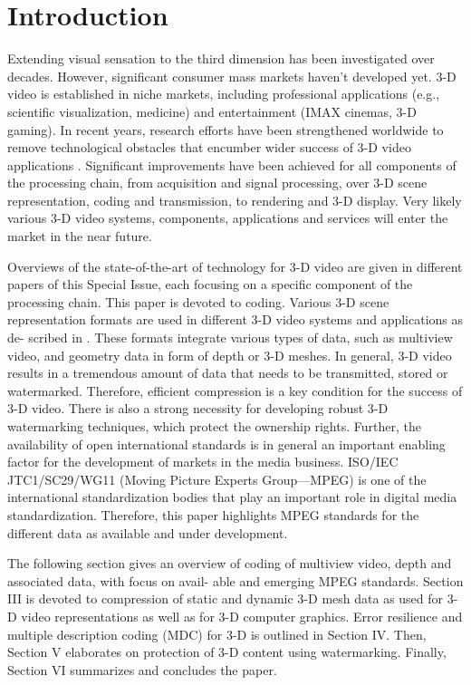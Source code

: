 \section{Introduction}

Extending visual sensation to the third dimension has been investigated over decades. However, significant consumer mass markets haven't developed yet. 3-D video is established in niche markets, including professional applications (e.g., scientific visualization, medicine) and entertainment (IMAX cinemas, 3-D gaming). In recent years, research efforts have been strengthened worldwide to remove technological obstacles that encumber wider success of 3-D video applications . Significant improvements have been achieved for all components of the processing chain, from acquisition and signal processing, over 3-D scene representation, coding and transmission, to rendering and 3-D display. Very likely various 3-D video systems, components, applications and services will enter the market in the near future.

Overviews of the state-of-the-art of technology for 3-D video are given in different papers of this Special Issue, each focusing on a specific component of the processing chain. This paper is devoted to coding. Various 3-D scene representation formats are used in different 3-D video systems and applications as de- scribed in . These formats integrate various types of data, such as multiview video, and geometry data in form of depth or 3-D meshes. In general, 3-D video results in a tremendous amount of data that needs to be transmitted, stored or watermarked. Therefore, efficient compression is a key condition for the success of 3-D video. There is also a strong necessity for developing robust 3-D watermarking techniques, which protect the ownership rights. Further, the availability of open international standards is in general an important enabling factor for the development of markets in the media business. ISO/IEC JTC1/SC29/WG11 (Moving Picture Experts Group—MPEG) is one of the international standardization bodies that play an important role in digital media standardization. Therefore, this paper highlights MPEG standards for the different data as available and under development.

The following section gives an overview of coding of multiview video, depth and associated data, with focus on avail- able and emerging MPEG standards. Section III is devoted to compression of static and dynamic 3-D mesh data as used for 3-D video representations as well as for 3-D computer graphics. Error resilience and multiple description coding (MDC) for 3-D is outlined in Section IV. Then, Section V elaborates on protection of 3-D content using watermarking. Finally, Section VI summarizes and concludes the paper.

